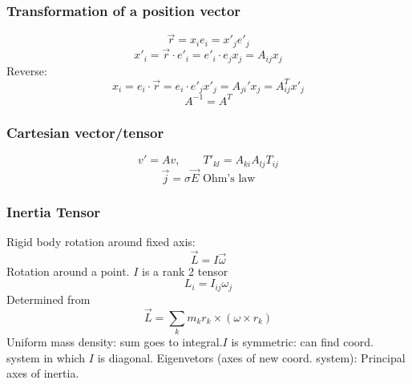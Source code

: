 \documentclass[a4paper,norsk, 10pt]{article}
\begin{document}
\subsubsection{Transformation of a position vector}
\begin{equation}
\vec{r} = x_i e_i = x'_j e'_j
\end{equation}
\begin{equation}
x'_i = \vec{r}\cdot e'_i = e'_i\cdot e_jx_j = A_{ij}x_j
\end{equation}
Reverse:
\begin{equation}
x_i = e_i\cdot\vec{r} = e_i\cdot e'_jx'_j = A_{ji}'x_j = A_{ij}^T x'_j
\end{equation}
\begin{equation}
A^{-1} = A^T
\end{equation}
\subsubsection{Cartesian vector/tensor}
\begin{equation}
v' = Av, \qquad T'_{kl} = A_{ki}A_{lj}T_{ij}
\end{equation}
\begin{equation}
\vec{j}=\sigma \vec{E} \text{ Ohm's law}
\end{equation}
\subsubsection{Inertia Tensor}
Rigid body rotation around fixed axis:
\begin{equation}
\vec{L} = I\vec{\omega} 
\end{equation}
Rotation around a point. $I$ is a rank 2 tensor
\begin{equation}
L_i = I_{ij}\omega_j
\end{equation}
Determined from
\begin{equation}
\vec{L} = \sum_k m_kr_k\times(\omega\times r_k)
\end{equation}
Uniform mass density: sum goes to integral.$I$ is symmetric: can find coord. system in which $I$ is diagonal. Eigenvetors (axes of new coord. system): Principal axes of inertia.
\end{document}
